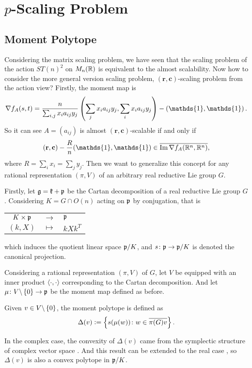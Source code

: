 \documentclass[suri,pdfbookmark]{engsuribt} %
\begin{document}
  \chapter{\texorpdfstring{$p$}{p}-Scaling Problem}

  \section{Moment Polytope}

  Considering the matrix scaling problem, we have seen that the scaling problem of the action $ST(n)^2$ on $M_n(\mathbb{R})$ is equivalent to the almost scalability. Now how to consider the more general version scaling problem, $(\mathbf{r},\mathbf{c})$-scaling problem from the action view? Firstly, the moment map is
  \begin{equation*}
    \nabla f_A(s,t) = \frac{n}{\sum_{i,j}x_ia_{ij}y_j} \bc{\sum_j x_ia_{ij}y_j,\sum_i x_ia_{ij}y_j} - \bc{\mathds{1},\mathds{1}}.
  \end{equation*}
  So it can see $A = (a_{ij})$ is almost $(\mathbf{r},\mathbf{c})$-scalable if and only if 
  \begin{equation*}
    (\mathbf{r},\mathbf{c})-\frac{R}{n}(\mathds{1},\mathds{1}) \in \clo{\Img \nabla f_A(\R^n,\R^n)},
  \end{equation*}
  where $R = \sum_ix_i =\sum_j y_j$. Then we want to generalize this concept for any rational representation $(\pi,V)$ of an arbitrary real reductive Lie group $G$. 

  Firstly, let $\mathfrak{g} = \mathfrak{k} + \mathfrak{p}$ be the Cartan decomposition of a real reductive Lie group $G$. Considering $K = G \cap O(n)$ acting on $\mathfrak{p}$ by conjugation, that is
  \begin{center}
    \begin{tabular}{c c l}
      $K \times \mathfrak{p}$ & $\longrightarrow$ & $ \mathfrak{p}$ \\
       $(k,X)$ & $\longmapsto$ & $kXk^T$
    \end{tabular}
  \end{center}
  which induces the quotient linear space $\mathfrak{p}/K$, and $s \colon \mathfrak{p} \rightarrow \mathfrak{p}/K$ is denoted the canonical projection.

  Considering a rational representation $(\pi,V)$ of $G$, let $V$ be equipped with an inner product $\left\langle \cdot,\cdot \right\rangle$ corresponding to the Cartan decomposition. And let $\mu \colon V \backslash \left\{0\right\} \rightarrow \mathfrak{p}$ be the moment map defined as before.
  \begin{defn}
    Given $v \in V \backslash \left\{0\right\}$, the moment polytope is defined as
    \begin{equation*}
      \Delta(v) \vcentcolon= \left\{s(\mu(w)) \colon w \in \overline{\pi(G)v}\right\}.
    \end{equation*}
  \end{defn}
  \begin{rem}
    In the complex case, the convexity of $\Delta(v)$ came from the symplectic structure of complex vector space \cite{key23}. And this result can be extended to the real case \cite{key10,key11}, so $\Delta(v)$ is also a convex polytope in $\mathfrak{p}/K$.
  \end{rem}
\end{document}
